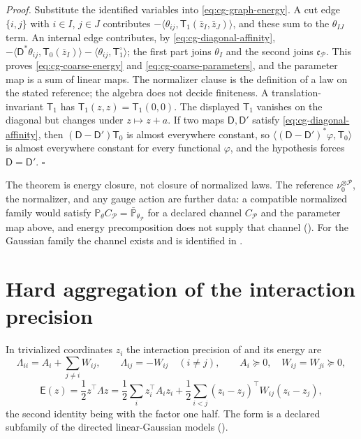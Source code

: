 \noindent\emph{Proof.}
Substitute the identified variables into \eqref{eq:cg-graph-energy}. A cut edge
\(\{i,j\}\) with \(i\in I\), \(j\in J\) contributes
\(-\langle\theta_{ij},\mathsf T_1(\bar z_I,\bar z_J)\rangle\), and these sum to the
\(\theta_{IJ}\) term. An internal edge contributes, by
\eqref{eq:cg-diagonal-affinity},
\(-\langle\mathsf D^\ast\theta_{ij},\mathsf T_0(\bar z_I)\rangle
-\langle\theta_{ij},\mathsf T_1^\circ\rangle\); the first part joins \(\theta_I\) and
the second joins \(\mathfrak c_{\mathcal P}\). This proves
\eqref{eq:cg-coarse-energy} and \eqref{eq:cg-coarse-parameters}, and the
parameter map is a sum of linear maps. The normalizer clause is the definition
of a law on the stated reference; the algebra does not decide finiteness. A
translation-invariant \(\mathsf T_1\) has \(\mathsf T_1(z,z)=\mathsf T_1(0,0)\). The displayed
\(\mathsf T_1\) vanishes on the diagonal but changes under \(z\mapsto z+a\). If two
maps \(\mathsf D,\mathsf D'\) satisfy \eqref{eq:cg-diagonal-affinity}, then
\((\mathsf D-\mathsf D')\mathsf T_0\) is almost everywhere constant, so
\(\langle(\mathsf D-\mathsf D')^\ast\varphi,\mathsf T_0\rangle\) is almost everywhere
constant for every functional \(\varphi\), and the hypothesis forces
\(\mathsf D=\mathsf D'\). \(\square\)

The theorem is energy closure, not closure of normalized laws. The reference
\(\nu_0^{\otimes\mathcal P}\), the normalizer, and any gauge action are further
data: a compatible normalized family would satisfy
\(\mathbb P_\theta C_{\mathcal P}=\bar{\mathbb P}_{\theta_{\mathcal P}}\) for a
declared channel \(C_{\mathcal P}\) and the parameter map above, and energy
precomposition does not supply that channel ().
For the Gaussian family the channel exists and is identified in
.

\section{Hard aggregation of the interaction precision}
\label{sec:cg-gaussian-aggregation}

In trivialized coordinates \(z_i\) the interaction precision of
 and its energy are
\begin{equation}
\Lambda_{ii}=A_i+\sum_{j\neq i}W_{ij},\qquad
\Lambda_{ij}=-W_{ij}\quad(i\neq j),
\qquad
A_i\succeq0,\quad W_{ij}=W_{ji}\succeq0,
\label{eq:cg-interaction-family}
\end{equation}
\begin{equation}
\mathsf E(z)=\frac12z^\top\Lambda z
=\frac12\sum_i z_i^\top A_i z_i
+\frac12\sum_{i<j}(z_i-z_j)^\top W_{ij}(z_i-z_j),
\label{eq:cg-trivialized-energy}
\end{equation}
the second identity being  with the
factor one half. The form is a declared subfamily of the directed
linear-Gaussian models ().


